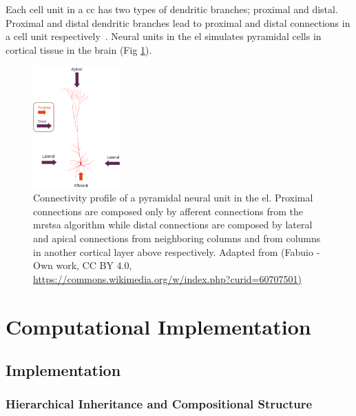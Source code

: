 \documentclass[10pt,journal,compsoc]{IEEEtran}
\begin{document}
Each cell unit in a \gls{cc} has two types of dendritic branches; proximal and distal. Proximal and distal dendritic branches lead to proximal and distal connections in a cell unit respectively~\cite{Dematties2018}. Neural units in the \gls{el} simulates pyramidal cells in cortical tissue in the brain (Fig \ref{fig:Pyramidal_Cell}). 

\begin{figure}[h!]
    \centering
    \includegraphics[width=0.3\textwidth]{Pyramidal_Cell.png}
    \caption{Connectivity profile of a pyramidal neural unit in the \gls{el}. Proximal connections are composed only by afferent connections from the \gls{mrstsa} algorithm while distal connections are composed by lateral and apical connections from neighboring columns and    from columns in another cortical layer above respectively. Adapted from (Fabuio - Own work, CC BY 4.0, \protect\url{https://commons.wikimedia.org/w/index.php?curid=60707501)}}
    \label{fig:Pyramidal_Cell}
\end{figure}













\section{Computational Implementation}

\subsection{ Implementation}







\subsubsection{ Hierarchical Inheritance and Compositional Structure}
\end{document}
